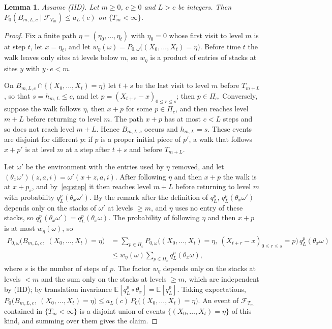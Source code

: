 \documentclass[11pt]{amsart}
\newtheorem{lemma}[theorem]{Lemma}
\theoremstyle{remark}
\newcommand{\E}{\mathbb{E}}
\begin{document}
\begin{lemma}\label{lem:fresh}
Assume (IID). Let $m\ge0$, $c\ge0$ and $L>c$ be integers. Then $P_0(B_{m,L,c}\mid\mathcal F_{T_m})\le a_L(c)$ on $\{T_m<\infty\}$.
\end{lemma}

\begin{proof}
Fix a finite path $\eta=(\eta_0,\dots,\eta_t)$ with $\eta_0=0$ whose first visit to level $m$ is at step $t$, let
$x=\eta_t$, and let $w_\eta(\omega)=P_{0,\omega}\bigl((X_0,\dots,X_t)=\eta\bigr)$. Before time $t$ the walk leaves only
sites at levels below $m$, so $w_\eta$ is a product of entries of stacks at sites $y$ with $y\cdot e<m$.

On $B_{m,L,c}\cap\{(X_0,\dots,X_t)=\eta\}$ let $t+s$ be the last visit to level $m$ before $T_{m+L}$, so that
$s=h_{m,L}\le c$, and let $p=(X_{t+r}-x)_{0\le r\le s}$; then $p\in\Pi_c$. Conversely, suppose the walk follows $\eta$, then
$x+p$ for some $p\in\Pi_c$, and then reaches level $m+L$ before returning to level $m$. The path $x+p$ has at most
$c<L$ steps and so does not reach level $m+L$. Hence $B_{m,L,c}$ occurs and $h_{m,L}=s$. These events are disjoint
for different $p$: if $p$ is a proper initial piece of $p'$, a walk that follows $x+p'$ is at level $m$ at a step
after $t+s$ and before $T_{m+L}$.

Let $\omega'$ be the environment with the entries used by $\eta$ removed, and let
$(\theta_x\omega')(z,a,i)=\omega'(x+z,a,i)$. After following $\eta$ and then $x+p$ the walk is at $x+p_s$, and
by~\eqref{eq:step} it then reaches level $m+L$ before returning to level $m$ with probability
$q_L^p(\theta_x\omega')$. By the remark after the definition of $q_L^p$, $q_L^p(\theta_x\omega')$ depends only on the stacks of $\omega'$ at
levels $\ge m$, and $\eta$ uses no entry of these stacks, so $q_L^p(\theta_x\omega')=q_L^p(\theta_x\omega)$. The probability of following $\eta$
and then $x+p$ is at most $w_\eta(\omega)$, so
\begin{align*}
P_{0,\omega}\bigl(B_{m,L,c},\ (X_0,\dots,X_t)=\eta\bigr)
&=\sum_{p\in\Pi_c}P_{0,\omega}\bigl((X_0,\dots,X_t)=\eta,\ (X_{t+r}-x)_{0\le r\le s}=p\bigr)\,q_L^p(\theta_x\omega)\\
&\le w_\eta(\omega)\sum_{p\in\Pi_c}q_L^p(\theta_x\omega),
\end{align*}
where $s$ is the number of steps of $p$.
The factor $w_\eta$ depends only on the stacks at levels $<m$ and the sum only on the stacks at levels $\ge m$, which
are independent by (IID); by translation invariance $\E[q_L^p\circ\theta_x]=\E[q_L^p]$. Taking expectations,
$P_0\bigl(B_{m,L,c},\ (X_0,\dots,X_t)=\eta\bigr)\le a_L(c)\,P_0\bigl((X_0,\dots,X_t)=\eta\bigr)$. An event of
$\mathcal F_{T_m}$ contained in $\{T_m<\infty\}$ is a disjoint union of events $\{(X_0,\dots,X_t)=\eta\}$ of this
kind, and summing over them gives the claim.
\end{proof}
\end{document}
